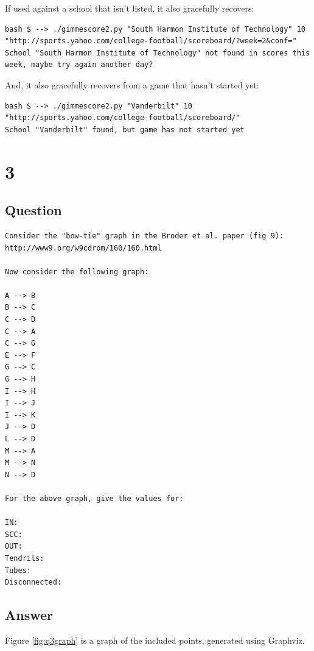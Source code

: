 \documentclass[letterpaper,11pt]{article}
\begin{document}
If used against a school that isn't listed, it also gracefully recovers:
\begin{lstlisting}[frame=single]
bash $ --> ./gimmescore2.py "South Harmon Institute of Technology" 10 "http://sports.yahoo.com/college-football/scoreboard/?week=2&conf="
School "South Harmon Institute of Technology" not found in scores this week, maybe try again another day?
\end{lstlisting}

And, it also gracefully recovers from a game that hasn't started yet:
\begin{lstlisting}[frame=single]
bash $ --> ./gimmescore2.py "Vanderbilt" 10 "http://sports.yahoo.com/college-football/scoreboard/"
School "Vanderbilt" found, but game has not started yet
\end{lstlisting}

\newpage




\newpage
\section*{3}

\subsection*{Question}

\begin{verbatim}
Consider the "bow-tie" graph in the Broder et al. paper (fig 9):
http://www9.org/w9cdrom/160/160.html

Now consider the following graph:

A --> B
B --> C
C --> D
C --> A
C --> G
E --> F
G --> C
G --> H
I --> H
I --> J
I --> K
J --> D 
L --> D
M --> A
M --> N
N --> D
    
For the above graph, give the values for:

IN: 
SCC: 
OUT: 
Tendrils: 
Tubes: 
Disconnected:
\end{verbatim}

\newpage
\subsection*{Answer}
Figure \ref{fig:q3graph} is a graph of the included points, generated using Graphviz.
\end{document}
